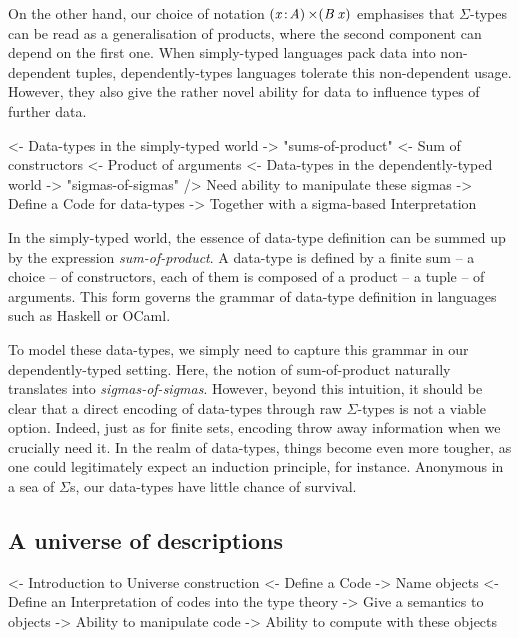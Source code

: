 On the other hand, our choice of notation $\SIGMA{\V{x}}{\V{A}} (\V{B}\:\V{x})$
emphasises that $\Sigma$-types can be read as a generalisation of products,
where the second component can depend on the first one. When simply-typed
languages pack data into non-dependent tuples, dependently-types languages
tolerate this non-dependent usage. However, they also give the rather novel
ability for data to influence types of further data.

\begin{wstructure}
<- Data-types in the simply-typed world
    -> "sums-of-product"
        <- Sum of constructors
        <- Product of arguments
<- Data-types in the dependently-typed world
    -> "sigmas-of-sigmas"
    /> Need ability to manipulate these sigmas
        -> Define a Code for data-types
        -> Together with a sigma-based Interpretation
\end{wstructure}

In the simply-typed world, the essence of data-type definition can be
summed up by the expression \emph{sum-of-product}. A data-type is defined
by a finite sum -- a choice -- of constructors, each of them is
composed of a product -- a tuple -- of arguments. This form governs
the grammar of data-type definition in languages such as Haskell or
OCaml.

To model these data-types, we simply need to capture this grammar in
our dependently-typed setting. Here, the notion of sum-of-product
naturally translates into \emph{sigmas-of-sigmas}. However, beyond
this intuition, it should be clear that a direct encoding of
data-types through raw $\Sigma$-types is not a viable option. Indeed,
just as for finite sets, encoding throw away information when we
crucially need it. In the realm of data-types, things become even more
tougher, as one could legitimately expect an induction principle, for
instance. Anonymous in a sea of $\Sigma$s, our data-types have little
chance of survival. 


\subsection{A universe of descriptions}
\label{sec:desc-universe}

\begin{wstructure}
<- Introduction to Universe construction
    <- Define a Code
        -> Name objects
    <- Define an Interpretation of codes into the type theory
        -> Give a semantics to objects
    -> Ability to manipulate code
    -> Ability to compute with these objects
\end{wstructure}

